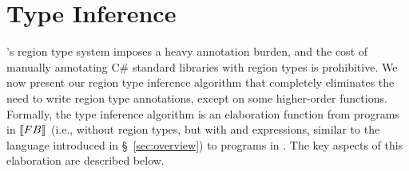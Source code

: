 \vspace*{-0.1in}
\section{Type Inference}
\label{sec:type-inference}

\name's region type system imposes a heavy annotation burden, and the
cost of manually annotating C\# standard libraries with region types
is prohibitive. We now present our region type inference algorithm
that completely eliminates the need to write region type annotations,
except on some higher-order functions. Formally, the type inference
algorithm is an elaboration function from programs in $\llbracket {\sc FB} \rrbracket$
(i.e., \FB without region types, but with  and 
expressions, similar to the language introduced in
\S~\ref{sec:overview}) to programs in \FB. The key aspects of this
elaboration are described below.

%

